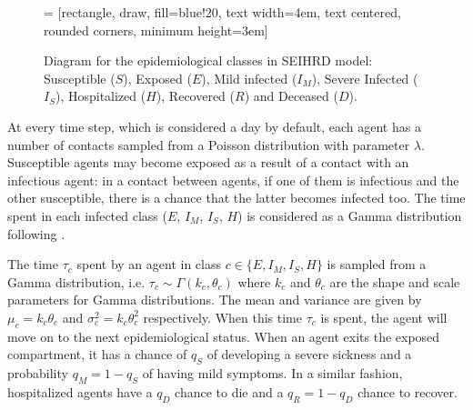 \documentclass[11pt,a4paper]{article}
\begin{document}
\begin{figure}[b]
    \captionsetup{width=0.5\textwidth}
    \begin{center}
         = [rectangle, draw, fill=blue!20, 
        text width=4em, text centered, rounded corners, minimum height=3em]
        \centering
    \end{center}
    \caption{Diagram for the epidemiological classes in SEIHRD model: Susceptible ($S$), Exposed ($E$), Mild infected ($I_M$), Severe Infected ($I_S$), Hospitalized ($H$), Recovered ($R$) and Deceased ($D$).}
    \label{diag:seihrd}
\end{figure}

At every time step, which is considered a day by default, each agent has a number of contacts sampled from a Poisson distribution with parameter $\lambda$. Susceptible agents may become exposed as a result of a contact with an infectious agent: in a contact between agents, if one of them is infectious and the other susceptible, there is a chance that the latter becomes infected too. The time spent in each infected class ($E$, $I_M$, $I_S$, $H$) is considered as a Gamma distribution following \cite{Qin2020}.

The time $\tau_c$ spent by an agent in class $c \in \{ E, I_M, I_S, H\}$ is sampled from a Gamma distribution, i.e. $\tau_c\sim \Gamma(k_c,\theta_c)$ where $k_{c}$ and $\theta_{c}$ are the shape and scale parameters for Gamma distributions. The mean and variance are given by $\mu_{c} = k_{c} \theta_{c}$ and $\sigma^2_{c} = k_{c} \theta_{c}^2$ respectively. When this time $\tau_c$ is spent, the agent will move on to the next epidemiological status. When an agent exits the exposed compartment, it has a chance of $q_S$ of developing a severe sickness and a probability $q_M = 1 - q_S$ of having mild symptoms. In a similar fashion, hospitalized agents have a $q_D$ chance to die and a $q_R = 1 - q_D$ chance to recover.
\end{document}
